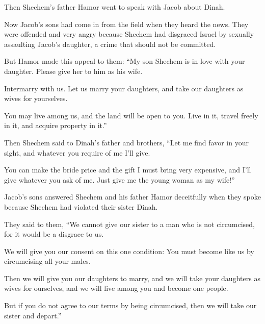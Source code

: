 \begin{scripture}
 Then Shechem's father Hamor went to speak with Jacob about Dinah.
 Now Jacob's sons had come in from the field when they heard the news. They were offended and very angry because Shechem had disgraced Israel by sexually assaulting Jacob's daughter, a crime that should not be committed.
\everypar{}

 But Hamor made this appeal to them: ``My son Shechem is in love with your daughter. Please give her to him as his wife.
 Intermarry with us. Let us marry your daughters, and take our daughters as wives for yourselves.
 You may live among us, and the land will be open to you. Live in it, travel freely in it, and acquire property in it.''
\everypar{}

 Then Shechem said to Dinah's father and brothers, ``Let me find favor in your sight, and whatever you require of me I'll give.
 You can make the bride price and the gift I must bring very expensive, and I'll give whatever you ask of me. Just give me the young woman as my wife!''
\everypar{}

 Jacob's sons answered Shechem and his father Hamor deceitfully when they spoke because Shechem had violated their sister Dinah.
 They said to them, ``We cannot give our sister to a man who is not circumcised, for it would be a disgrace to us.
 We will give you our consent on this one condition: You must become like us by circumcising all your males.
 Then we will give you our daughters to marry, and we will take your daughters as wives for ourselves, and we will live among you and become one people.
 But if you do not agree to our terms by being circumcised, then we will take our sister and depart.''
\everypar{}


\end{scripture}
